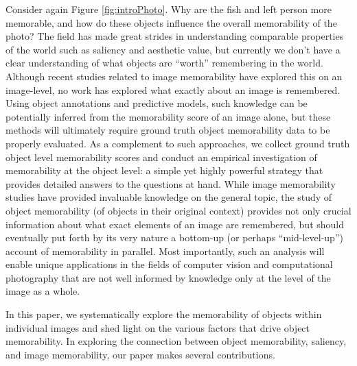 Consider again Figure \ref{fig:introPhoto}. Why
are the fish and left person more memorable, and how do these objects 
influence the overall memorability of the photo? The field has made
great strides in understanding comparable properties of the world such
as saliency and aesthetic value, but currently we don’t have a clear
understanding of what objects are ``worth'' remembering in the
world. 
%
Although recent studies related to image memorability have
explored this on an image-level, no work has explored what exactly
about an image is remembered. Using object annotations and predictive
models, such knowledge can be potentially inferred from the
memorability score of an image alone, but these methods will
ultimately require ground truth object memorability data to be
properly evaluated. As a complement to such approaches, we collect
ground truth object level memorability scores and conduct an empirical
investigation of  memorability at the object level: a simple yet
highly powerful strategy that provides detailed answers to the
questions at hand. While image memorability studies have provided
invaluable knowledge on the general topic, the study of object
memorability (of objects in their original context) provides not only
crucial information about what exact elements of an image are
remembered, but should eventually put forth by its very nature a
bottom-up (or perhaps “mid-level-up”) account of memorability in
parallel. Most importantly, such an analysis will enable unique
applications in the fields of computer vision and computational
photography that are not well informed by knowledge only at the level
of the image as a whole. 



In this paper, we systematically explore the memorability of objects
within individual images and shed light on the various factors that
drive object memorability. In exploring the connection between object
memorability, saliency, and image memorability, our paper makes
several contributions. 

